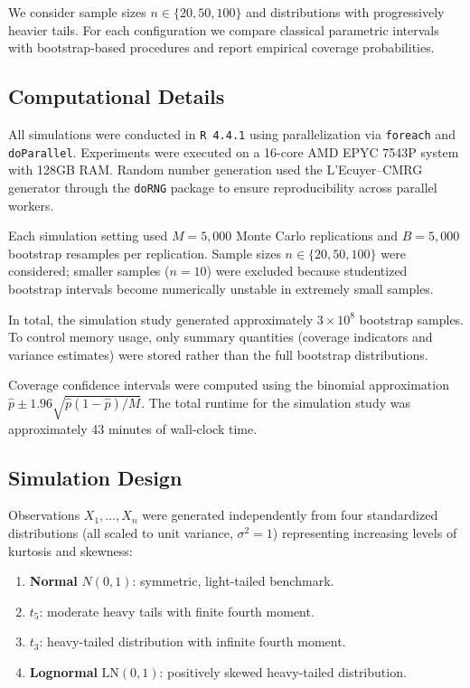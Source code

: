 \documentclass[12pt,a4paper]{article}
\begin{document}
We consider sample sizes $n\in\{20,50,100\}$ and distributions with progressively heavier tails. For each configuration we compare classical parametric intervals with bootstrap-based procedures and report empirical coverage probabilities.

\subsection{Computational Details}

All simulations were conducted in \texttt{R 4.4.1} using parallelization via
\texttt{foreach} and \texttt{doParallel}. Experiments were executed on a
16-core AMD EPYC 7543P system with 128GB RAM. Random number generation
used the L'Ecuyer--CMRG generator through the \texttt{doRNG} package to
ensure reproducibility across parallel workers.

Each simulation setting used $M=5{,}000$ Monte Carlo replications and
$B=5{,}000$ bootstrap resamples per replication. Sample sizes
$n\in\{20,50,100\}$ were considered; smaller samples ($n=10$) were
excluded because studentized bootstrap intervals become numerically
unstable in extremely small samples.

In total, the simulation study generated approximately
$3\times10^8$ bootstrap samples. To control memory usage, only summary
quantities (coverage indicators and variance estimates) were stored
rather than the full bootstrap distributions.

Coverage confidence intervals were computed using the binomial
approximation $\hat p \pm 1.96\sqrt{\hat p(1-\hat p)/M}$. The total
runtime for the simulation study was approximately 43 minutes of
wall-clock time.

\subsection{Simulation Design}

Observations $X_1,\dots,X_n$ were generated independently from four
standardized distributions (all scaled to unit variance,
$\sigma^2=1$) representing increasing levels of kurtosis and skewness:

\begin{enumerate}
\item \textbf{Normal} $N(0,1)$: symmetric, light-tailed benchmark.
\item \textbf{$t_5$}: moderate heavy tails with finite fourth moment.
\item \textbf{$t_3$}: heavy-tailed distribution with infinite fourth moment.
\item \textbf{Lognormal} $\mathrm{LN}(0,1)$: positively skewed heavy-tailed distribution.
\end{enumerate}
\end{document}

